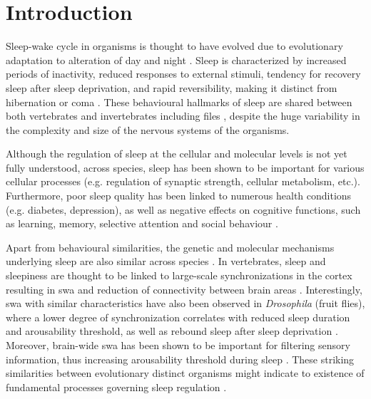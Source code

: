 \documentclass[../main.tex]{subfiles}
\begin{document}
\section{Introduction} \label{sec:introduction}

Sleep-wake cycle in organisms is thought to have evolved due to evolutionary
adaptation to alteration of day and night \parencite{suarez-grimaltNeuralArchitectureSleep2021}.
Sleep is characterized by increased periods of inactivity, reduced responses to external stimuli,
tendency for recovery sleep after sleep deprivation, and rapid reversibility, making it
distinct from hibernation or coma
\parencite{shaferRegulationDrosophilaSleep2021,andreaniCircadianProgrammingEllipsoid2022,donleaRecurrentCircuitryBalancing2018}.
These behavioural hallmarks of sleep are shared between both vertebrates and invertebrates
including files \parencite{shaferRegulationDrosophilaSleep2021,andreaniCircadianProgrammingEllipsoid2022},
despite the huge variability in the complexity and size of the nervous systems of the organisms.

Although the regulation of sleep at the cellular and molecular levels is not yet fully understood, across species, sleep has been shown to be important for various cellular processes (e.g. regulation of synaptic strength, cellular metabolism, etc.). Furthermore, poor sleep quality has been linked to numerous health conditions (e.g. diabetes, depression), as well as negative effects on cognitive functions, such as learning, memory, selective attention and social behaviour \parencite{shaferRegulationDrosophilaSleep2021,dubowyCircadianRhythmsSleep2017,suarez-grimaltNeuralArchitectureSleep2021}.

Apart from behavioural similarities, the genetic and molecular mechanisms underlying
sleep are also similar across species \parencite{dubowyCircadianRhythmsSleep2017}.
In vertebrates, sleep and sleepiness are thought to be linked to large-scale synchronizations in the cortex resulting in \gls{swa} and reduction of connectivity between brain areas \parencite{suarez-grimaltNeuralArchitectureSleep2021,raccugliaNetworkSpecificSynchronizationElectrical2019}.
Interestingly, \gls{swa} with similar characteristics have also been observed in \textit{Drosophila} (fruit flies), where a lower degree of synchronization correlates with reduced sleep duration and arousability
threshold, as well as rebound sleep after sleep deprivation
\parencite{raccugliaNetworkSpecificSynchronizationElectrical2019}. Moreover, brain-wide
\gls{swa} has been shown to be important for filtering sensory information, thus increasing
arousability threshold during sleep \parencite{raccugliaCoherentMultilevelNetwork2022}. These
striking similarities between evolutionary distinct organisms might indicate to existence of
fundamental processes governing sleep regulation \parencite{suarez-grimaltNeuralArchitectureSleep2021}.
\end{document}
